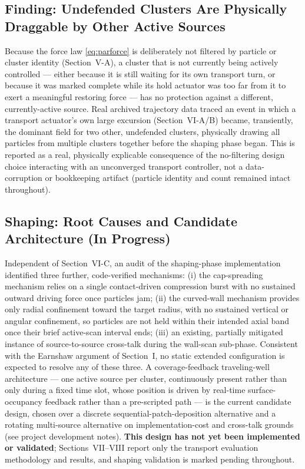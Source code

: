 \documentclass[journal]{IEEEtran}
\begin{document}
\subsection{Finding: Undefended Clusters Are Physically Draggable by Other Active Sources}
Because the force law \eqref{eq:parforce} is deliberately not filtered by
particle or cluster identity (Section~V-A), a cluster that is not currently
being actively controlled --- either because it is still waiting for its
own transport turn, or because it was marked complete while its hold
actuator was too far from it to exert a meaningful restoring force ---
has no protection against a different, currently-active source. Real
archived trajectory data traced an event in which a transport actuator's
own large excursion (Section~VI-A/B) became, transiently, the dominant
field for two other, undefended clusters, physically drawing all
particles from multiple clusters together before the shaping phase began.
This is reported as a real, physically explicable consequence of the
no-filtering design choice interacting with an unconverged transport
controller, not a data-corruption or bookkeeping artifact (particle
identity and count remained intact throughout).

\subsection{Shaping: Root Causes and Candidate Architecture (In Progress)}
Independent of Section~VI-C, an audit of the shaping-phase implementation
identified three further, code-verified mechanisms: (i) the cap-spreading
mechanism relies on a single contact-driven compression burst with no
sustained outward driving force once particles jam; (ii) the curved-wall
mechanism provides only radial confinement toward the target radius, with
no sustained vertical or angular confinement, so particles are not held
within their intended axial band once their brief active-scan interval
ends; (iii) an existing, partially mitigated instance of source-to-source
cross-talk during the wall-scan sub-phase. Consistent with the Earnshaw
argument of Section~I, no static extended configuration is expected to
resolve any of these three. A coverage-feedback traveling-well
architecture --- one active source per cluster, continuously
present rather than only during a fixed time slot, whose position is
driven by real-time surface-occupancy feedback rather than a
pre-scripted path --- is the current candidate design, chosen over a
discrete sequential-patch-deposition alternative and a rotating
multi-source alternative on implementation-cost and cross-talk grounds
(see project development notes). \textbf{This design has not yet been
implemented or validated}; Sections~VII--VIII report only the transport
evaluation methodology and results, and shaping validation is marked
pending throughout.
\end{document}
